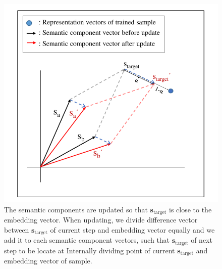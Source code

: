 \begin{figure}[!htb] %
  \includegraphics[width=\columnwidth]{../../figures/update.pdf}
  \caption{The semantic components are updated so that $ \mathbf{s}_{\text{target}} $ is close to the embedding vector. When updating, we divide difference vector between $\mathbf{s}_{\text{target}}$ of current step and embedding vector equally and we add it to each semantic component vectors, such that $\mathbf{s}_{\text{target}}$ of next step to be locate at Internally dividing point of current $\mathbf{s}_{\text{target}}$ and embedding vector of sample. 
}
  \label{fig:update}
\end{figure}



